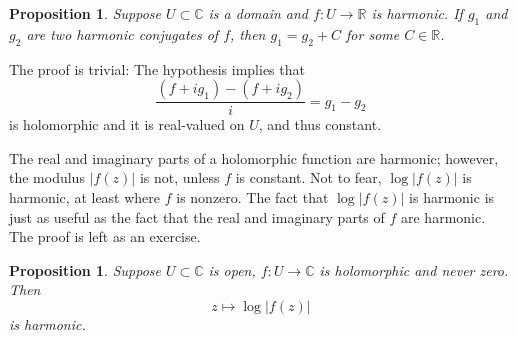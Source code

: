 \documentclass[12pt,openany]{book}
\newcommand{\sabs}[1]{\lvert {#1} \rvert}
\newcommand{\C}{{\mathbb{C}}}
\newcommand{\R}{{\mathbb{R}}}
\theoremstyle{plain}
\newtheorem{prop}[thm]{Proposition}
\theoremstyle{remark}
\theoremstyle{definition}
\theoremstyle{exercise}
\theoremstyle{example}
\begin{document}
\begin{prop} \label{prop:harmonicconjdifferbyconst}
Suppose
$U \subset \C$ is a domain and $f \colon U \to \R$ is harmonic.
If $g_1$ and $g_2$ are two harmonic conjugates of $f$,
then $g_1 = g_2 + C$ for some $C \in \R$.
\end{prop}

The proof is trivial: The hypothesis implies that
\begin{equation*}
\frac{(f + i g_1) - (f + i g_2)}{i} =  g_1-g_2
\end{equation*}
is holomorphic and it is real-valued on $U$, and thus constant.

The real and imaginary parts of a holomorphic function are harmonic;
however, the modulus $\sabs{f(z)}$ is not, unless $f$ is constant.  Not to fear,
$\log \sabs{f(z)}$ is harmonic, at least where $f$ is nonzero.
The fact that $\log \sabs{f(z)}$ is harmonic is just as useful
as the fact that the real and imaginary parts of $f$ are harmonic.
The proof is left as an exercise.

\begin{prop} \label{prop:logharm}
Suppose $U \subset \C$ is open, $f \colon U \to \C$ is holomorphic
and never zero.  Then
\begin{equation*}
z \mapsto \log \sabs{f(z)}
\end{equation*}
is harmonic.
\end{prop}
\end{document}

